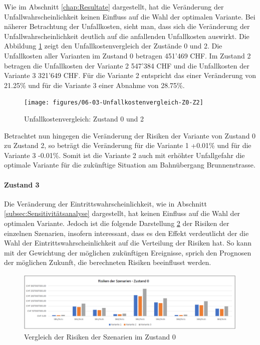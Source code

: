 Wie im Abschnitt \ref{chap:Resultate} dargestellt, hat die Veränderung der Unfallwahrscheinlichkeit keinen Einfluss auf die Wahl der optimalen Variante. 
Bei näherer Betrachtung der Unfallkosten, sieht man, dass sich die Veränderung der Unfallwahrscheinlichkeit deutlich auf die anfallenden Unfallkosten auswirkt. 
Die Abbildung \ref{img:UnfallVer.Z0-2} zeigt den Unfallkostenvergleich der Zustände 0 und 2. Die Unfallkosten aller Varianten im Zustand 0 betragen 451'469 CHF. Im Zustand 2 betragen die Unfallkosten der Variante 2 547'384 CHF und die Unfallkosten der Variante 3 321'649 CHF. Für die Variante 2 entspricht das einer Veränderung von 21.25\% und für die Variante 3 einer Abnahme von 28.75\%. 

\begin{figure}[h!]
	\centering
	\texttt{[image: figures/06-03-Unfallkostenvergleich-Z0-Z2]}
	\caption[Unfallkostenvergleich: Zustand 0 und 2]{Unfallkostenvergleich: Zustand 0 und 2}
	\label{img:UnfallVer.Z0-2}
\end{figure}

Betrachtet nun hingegen die Veränderung der Risiken der Variante von Zustand 0 zu Zustand 2, so beträgt die Veränderung für die Variante 1 +0.01\% und für die Variante 3 -0.01\%. 
Somit ist die Variante 2 auch mit erhöhter Unfallgefahr die optimale Variante für die zukünftige Situation am Bahnübergang Brunnenstrasse. 
 

\paragraph{Zustand 3} 

Die Veränderung der Eintrittswahrscheinlichkeit, wie in Abschnitt \ref{subsec:Sensitivitätsanalyse} dargestellt, hat keinen Einfluss auf die Wahl der optimalen Variante. Jedoch ist die folgende Darstellung \ref{img:SzeVer-Z0} der Risiken der einzelnen Szenarien, insofern interessant, dass es den Effekt verdeutlicht der die Wahl der Eintrittswahrscheinlichkeit auf die Verteilung der Risiken hat. So kann mit der Gewichtung der möglichen zukünftigen Ereignisse, sprich den Prognosen der möglichen Zukunft, die berechneten Risiken beeinflusst werden. 

\begin{figure}[h!]
	\centering
	\includegraphics[width=.45\textwidth]{figures/f-06-04-RisikenSzenarienZ0}
	\caption[Szenarienvergleich im Zustand 0]{Vergleich der Risiken der Szenarien im Zustand 0}
	\label{img:SzeVer-Z0}
\end{figure} 

